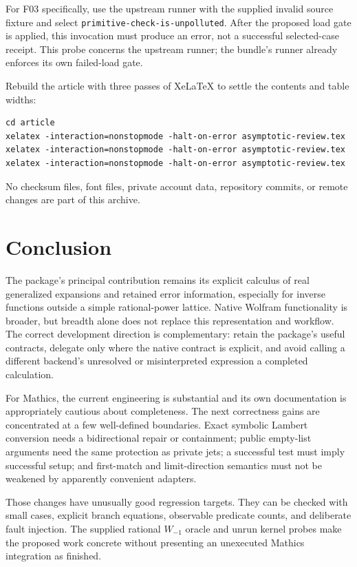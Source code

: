 \documentclass[11pt,letterpaper]{article}
\begin{document}
For F03 specifically, use the upstream runner with the supplied invalid source fixture and select \nolinkurl{primitive-check-is-unpolluted}. After the proposed load gate is applied, this invocation must produce an error, not a successful selected-case receipt. This probe concerns the upstream runner; the bundle's runner already enforces its own failed-load gate.

Rebuild the article with three passes of XeLaTeX to settle the contents and table widths:
\begin{lstlisting}
cd article
xelatex -interaction=nonstopmode -halt-on-error asymptotic-review.tex
xelatex -interaction=nonstopmode -halt-on-error asymptotic-review.tex
xelatex -interaction=nonstopmode -halt-on-error asymptotic-review.tex
\end{lstlisting}
No checksum files, font files, private account data, repository commits, or remote changes are part of this archive.

\section{Conclusion}

The package's principal contribution remains its explicit calculus of real generalized expansions and retained error information, especially for inverse functions outside a simple rational-power lattice. Native Wolfram functionality is broader, but breadth alone does not replace this representation and workflow. The correct development direction is complementary: retain the package's useful contracts, delegate only where the native contract is explicit, and avoid calling a different backend's unresolved or misinterpreted expression a completed calculation.

For Mathics, the current engineering is substantial and its own documentation is appropriately cautious about completeness. The next correctness gains are concentrated at a few well-defined boundaries. Exact symbolic Lambert conversion needs a bidirectional repair or containment; public empty-list arguments need the same protection as private jets; a successful test must imply successful setup; and first-match and limit-direction semantics must not be weakened by apparently convenient adapters.

Those changes have unusually good regression targets. They can be checked with small cases, explicit branch equations, observable predicate counts, and deliberate fault injection. The supplied rational $W_{-1}$ oracle and unrun kernel probes make the proposed work concrete without presenting an unexecuted Mathics integration as finished.
\end{document}
